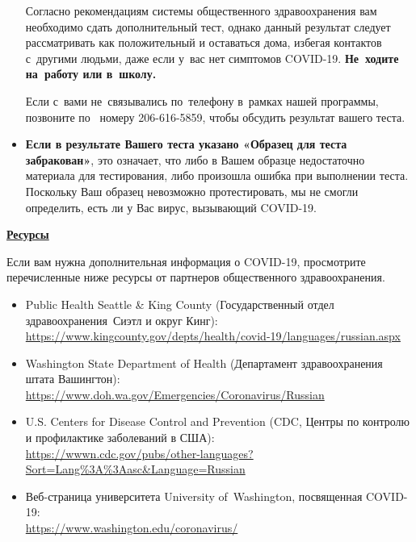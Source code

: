\documentclass[10pt]{article}
\begin{document}
\begin{itemize}
  Согласно рекомендациям системы общественного здравоохранения вам необходимо
  сдать дополнительный тест, однако данный результат следует рассматривать как
  положительный и оставаться дома, избегая контактов с другими людьми, даже если
  у вас нет симптомов COVID-19. \textbf{Не ходите на работу или в школу.}

  Если с вами не связывались по телефону в рамках нашей программы, позвоните по 
  номеру 206-616-5859, чтобы обсудить результат вашего теста.

\item

  \textbf{Если в результате Вашего теста указано «Образец для теста
  забракован»}, это означает, что либо в Вашем образце недостаточно материала
  для тестирования, либо произошла ошибка при выполнении теста. Поскольку Ваш
  образец невозможно протестировать, мы не смогли определить, есть ли у Вас
  вирус, вызывающий COVID-19.

\end{itemize}

\bigskip

\large \underline{\textbf{Ресурсы}}

Если вам нужна дополнительная информация о COVID-19, просмотрите перечисленные
ниже ресурсы от партнеров общественного здравоохранения.

\begin{itemize}
\item
  Public Health \textemdash Seattle \& King County (Государственный отдел
  здравоохранения \textemdash Сиэтл и округ Кинг): \\
  \url{https://www.kingcounty.gov/depts/health/covid-19/languages/russian.aspx}

\item

  Washington State Department of Health (Департамент здравоохранения штата Вашингтон):\\
  \url{https://www.doh.wa.gov/Emergencies/Coronavirus/Russian}

\item
  U.S. Centers for Disease Control and Prevention (CDC, Центры по контролю и
  профилактике заболеваний в США):\\
  \url{https://wwwn.cdc.gov/pubs/other-languages?Sort=Lang%3A%3Aasc&Language=Russian}

\item
  Веб-страница университета University of Washington, посвященная COVID-19:\\
  \url{https://www.washington.edu/coronavirus/}

\end{itemize}
\end{document}
